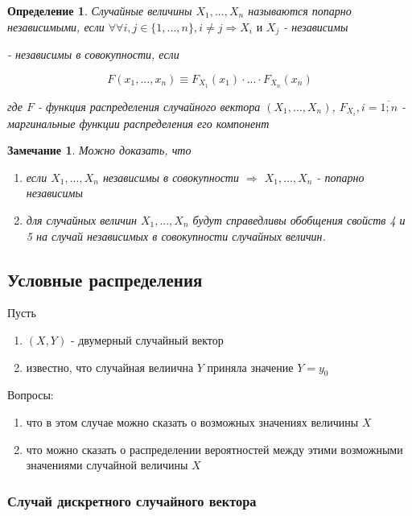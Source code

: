 \documentclass[a4paper, 14pt]{report}
\newtheorem{defenition}{Определение}[section]
\newtheorem{note}{Замечание}[section]
\begin{document}
\begin{defenition}
    Случайные величины $X_1,...,X_n$ называются попарно независимыми, если $\forall \forall i, j \in \{1,...,n\}, i \ne j \Rightarrow X_i \text{ и } X_j$ - независимы

    - независимы в совокупности, если

    $$
    F(x_1,...,x_n) \equiv F_{X_1}(x_1) \cdot ... \cdot F_{X_n}(x_n)
    $$

    где $F$ - функция распределения случайного вектора $(X_1, ..., X_n)$, $F_{X_i}, i = \overline{1;n}$ - маргинальные функции распределения его компонент
\end{defenition}

\begin{note}
    Можно доказать, что

    \begin{enumerate}
        \item если $X_1, ..., X_n$ независимы в совокупности $\Rightarrow$ $X_1, ..., X_n$ - попарно независимы

        \item для случайных величин $X_1, ..., X_n$ будут справедливы обобщения свойств 4 и 5 на случай независимых в совокупности случайных величин.
    \end{enumerate}
\end{note}

\subsection{Условные распределения}

Пусть

\begin{enumerate}
    \item $(X,Y)$ - двумерный случайный вектор
    \item известно, что случайная велиична $Y$ приняла значение $Y=y_0$
\end{enumerate}

Вопросы:

\begin{enumerate}
    \item что в этом случае можно сказать о возможных значениях величины $X$
    \item что можно сказать о распределении вероятностей между этими возможными значениями случайной величины $X$
\end{enumerate}

\subsubsection{Случай дискретного случайного вектора}
\end{document}
